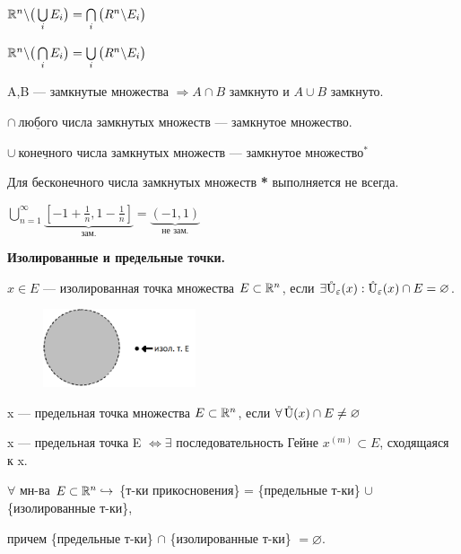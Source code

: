 
~~\parbox[t]{0.95\linewidth}{
	$\R^n \backslash \big( \bigcup\limits_i E_i \big) = \bigcap\limits_i \big( R^n \backslash E_i \big)$

	$\R^n \backslash \big( \bigcap\limits_i E_i \big) = \bigcup\limits_i \big( R^n \backslash E_i \big)$
}

\Consequence{} A,B --- замкнутые множества $\Rightarrow A \cap B$ замкнуто и $A \cup B$ замкнуто.

\Consequence{} 
\parbox[t]{0.95\linewidth}{
	$\cap \ \underline{\text{любого}}$ числа замкнутых множеств --- замкнутое множество.

	$\cup \ \underline{\text{конечного}}$ числа замкнутых множеств --- замкнутое множество$^{ 	\textbf{*}}$
}

\newpage

\Note Для бесконечного числа замкнутых множеств \textbf{*} выполняется не всегда.

\Example  $\bigcup\limits_{n=1}^{\infty} \underbrace{\left[ -1 + \frac{1}{n}, 1 - \frac{1}{n} \right]}_{\text{зам.}} = \underbrace{(-1, 1)}_{\text{не зам.}}$

\smallskip

 \textbf{Изолированные и предельные точки.}

\Def $x \in E$  --- изолированная точка множества $E \subset \R^n$, если $\exists \Uoe(x) : \Uoe(x) \cap E = \varnothing$.

\Example 
\begin{figure}[h]
	\begin{center}
	    \includegraphics[width=0.4\textwidth]{9.png}
	  \end{center}
	\caption{}
\end{figure}

\Def x --- предельная точка множества $E \subset \R^n$, если $\forall \, \Uo(x) \cap E \neq \varnothing$

\Note x --- предельная точка E $\Leftrightarrow \exists$ последовательность Гейне ${x^{(m)}} \subset E$, сходящаяся к x.

\Note \parbox[t]{0.95\linewidth}{
	$\forall$ мн-ва $E \subset \R^n \holds$ \{т-ки прикосновения\} = \{предельные т-ки\}  
	$\cup$ \{изолированные т-ки\},

	причем \{предельные т-ки\}  $\cap$ \{изолированные т-ки\} $= \varnothing$.
}

